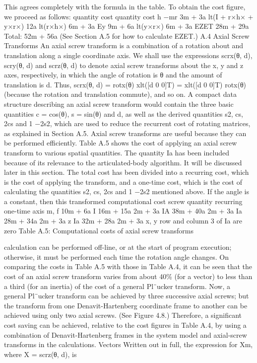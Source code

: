 This agrees completely with the formula in the table. To obtain the cost figure, we proceed as follows: quantity cost quantity cost h −mr 3m + 3a lt(I + r×h× + y×r×) 12a lt(r×h×) 6m + 3a Ey 9m + 6a lt(y×r×) 6m + 3a EZET 28m + 29a Total: 52m + 56a (See Section A.5 for how to calculate EZET.) A.4 Axial Screw Transforms An axial screw transform is a combination of a rotation about and translation along a single coordinate axis. We shall use the expressions scrx(θ, d), scry(θ, d) and scrz(θ, d) to denote axial screw transforms about the x, y and z axes, respectively, in which the angle of rotation is θ and the amount of translation is d. Thus, scrx(θ, d) = rotx(θ) xlt([d 0 0]T) = xlt([d 0 0]T) rotx(θ) (because the rotation and translation commute), and so on. A compact data structure describing an axial screw transform would contain the three basic quantities c = cos(θ), s = sin(θ) and d, as well as the derived quantities s2, cs, 2cs and 1 −2s2, which are used to reduce the recurrent cost of rotating matrices, as explained in Section A.5. Axial screw transforms are useful because they can be performed efficiently. Table A.5 shows the cost of applying an axial screw transform to various spatial quantities. The quantity Ia has been included because of its relevance to the articulated-body algorithm. It will be discussed later in this section. The total cost has been divided into a recurring cost, which is the cost of applying the transform, and a one-time cost, which is the cost of calculating the quantities s2, cs, 2cs and 1 −2s2 mentioned above. If the angle is a constant, then this transformed computational cost screw quantity recurring one-time axis m, f 10m + 6a I 16m + 15a 2m + 3a IA 38m + 40a 2m + 3a Ia 28m + 34a 2m + 3a z Ia 32m + 28a 2m + 3a x, y row and column 3 of Ia are zero Table A.5: Computational costs of axial screw transforms

calculation can be performed off-line, or at the start of program execution; otherwise, it must be performed each time the rotation angle changes. On comparing the costs in Table A.5 with those in Table A.4, it can be seen that the cost of an axial screw transform varies from about 40\% (for a vector) to less than a third (for an inertia) of the cost of a general Pl¨ucker transform. Now, a general Pl¨ucker transform can be achieved by three successive axial screws; but the transform from one Denavit-Hartenberg coordinate frame to another can be achieved using only two axial screws. (See Figure 4.8.) Therefore, a significant cost saving can be achieved, relative to the cost figures in Table A.4, by using a combination of Denavit-Hartenberg frames in the system model and axial-screw transforms in the calculations. Vectors Written out in full, the expression for Xm, where X = scrz(θ, d), is

